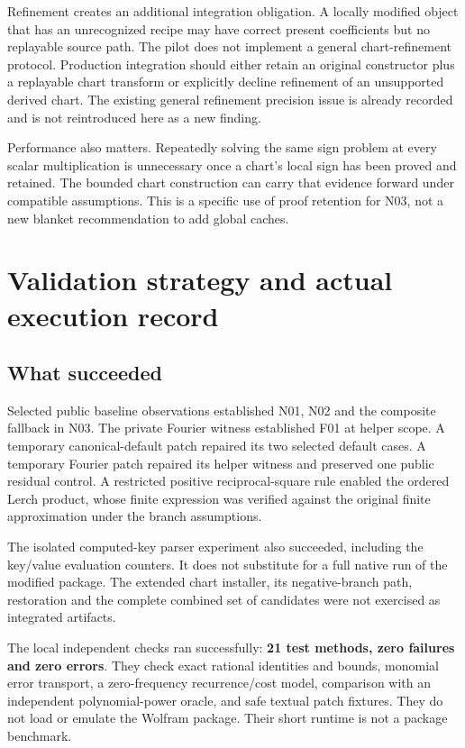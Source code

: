 \documentclass[11pt,a4paper]{article}
\begin{document}
Refinement creates an additional integration obligation. A locally modified object that has an unrecognized recipe may have correct present coefficients but no replayable source path. The pilot does not implement a general chart-refinement protocol. Production integration should either retain an original constructor plus a replayable chart transform or explicitly decline refinement of an unsupported derived chart. The existing general refinement precision issue is already recorded and is not reintroduced here as a new finding.

Performance also matters. Repeatedly solving the same sign problem at every scalar multiplication is unnecessary once a chart's local sign has been proved and retained. The bounded chart construction can carry that evidence forward under compatible assumptions. This is a specific use of proof retention for N03, not a new blanket recommendation to add global caches.

\section{Validation strategy and actual execution record}
\label{sec:validation}
\subsection{What succeeded}
Selected public baseline observations established N01, N02 and the composite fallback in N03. The private Fourier witness established F01 at helper scope. A temporary canonical-default patch repaired its two selected default cases. A temporary Fourier patch repaired its helper witness and preserved one public residual control. A restricted positive reciprocal-square rule enabled the ordered Lerch product, whose finite expression was verified against the original finite approximation under the branch assumptions.

The isolated computed-key parser experiment also succeeded, including the key/value evaluation counters. It does not substitute for a full native run of the modified package. The extended chart installer, its negative-branch path, restoration and the complete combined set of candidates were not exercised as integrated artifacts.

The local independent checks ran successfully: \textbf{21 test methods, zero failures and zero errors}. They check exact rational identities and bounds, monomial error transport, a zero-frequency recurrence/cost model, comparison with an independent polynomial-power oracle, and safe textual patch fixtures. They do not load or emulate the Wolfram package. Their short runtime is not a package benchmark.
\end{document}
